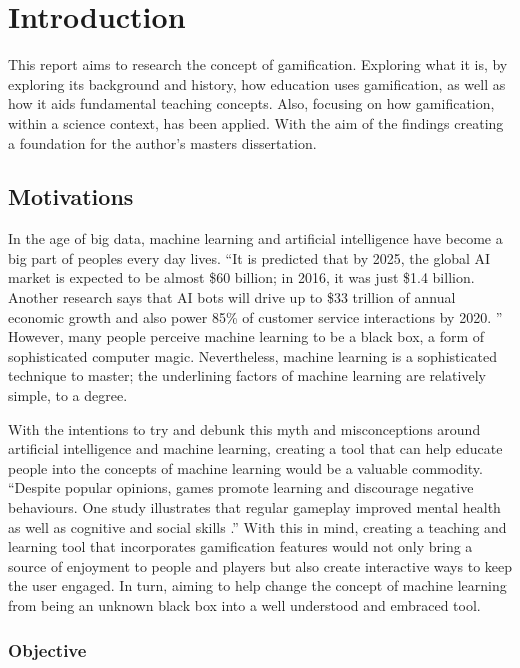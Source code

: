 \chapter{Introduction}
	\label{chap:intro}
	
	This report aims to research the concept of gamification. Exploring what it is, by exploring its background and history, how education uses gamification, as well as how it aids fundamental teaching concepts. Also, focusing on how gamification, within a science context, has been applied. With the aim of the findings creating a foundation for the author’s masters dissertation.
	
	\section{Motivations}
		\label{sec:intro_motivation} 
		
		In the age of big data, machine learning and artificial intelligence have become a big part of peoples every day lives. “It is predicted that by 2025, the global AI market is expected to be almost \$60 billion; in 2016, it was just \$1.4 billion. Another research says that AI bots will drive up to \$33 trillion of annual economic growth and also power 85\% of customer service interactions by 2020. \cite{hackernoon}” However, many people perceive machine learning to be a black box, a form of sophisticated computer magic. Nevertheless, machine learning is a sophisticated technique to master; the underlining factors of machine learning are relatively simple, to a degree.
		
		With the intentions to try and debunk this myth and misconceptions around artificial intelligence and machine learning, creating a tool that can help educate people into the concepts of machine learning would be a valuable commodity. “Despite popular opinions, games promote learning and discourage negative behaviours. One study illustrates that regular gameplay improved mental health as well as cognitive and social skills \cite{classcraft}.” With this in mind, creating a teaching and learning tool that incorporates gamification features would not only bring a source of enjoyment to people and players but also create interactive ways to keep the user engaged. In turn, aiming to help change the concept of machine learning from being an unknown black box into a well understood and embraced tool.
	
	\subsection{Objective}
		\label{sec:intro_objective} 
		
